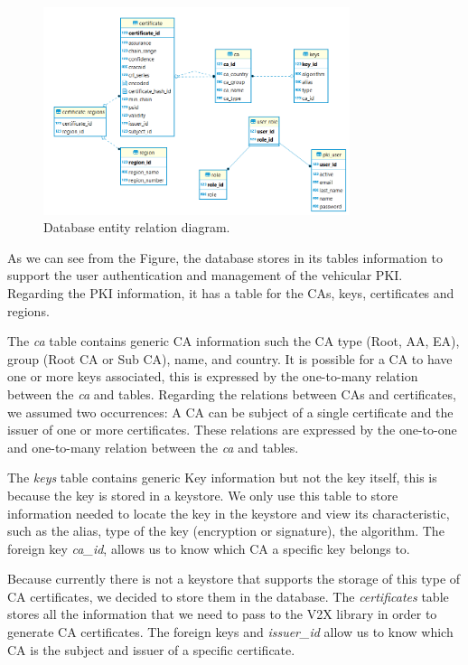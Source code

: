 \begin{figure}
	\centering
	\includegraphics[width=0.8\textwidth]{Figures/db_diagram}
	\caption{\label{fig:database_diagram}Database entity relation diagram.}
\end{figure}

As we can see from the Figure, the database stores in its tables information to support the user authentication and management of the vehicular PKI. Regarding the PKI information, it has a table for the CAs, keys, certificates and regions. 

The \textit{ca} table contains generic CA information such the CA type (Root, AA, EA), group (Root CA or Sub CA), name, and country. It is possible for a CA to have one or more keys associated, this is expressed by the one-to-many relation between the \textit{ca} and  tables. Regarding the relations between CAs and certificates, we assumed two occurrences: A CA can be subject of a single certificate and the issuer of one or more certificates. These relations are expressed by the one-to-one and one-to-many relation between the \textit{ca} and  tables.

The \textit{keys} table contains generic Key information but not the key itself, this is because the key is stored in a keystore. We only use this table to store information needed to locate the key in the keystore and view its characteristic, such as the alias, type of the key (encryption or signature), the algorithm. The foreign key \textit{ca\_id}, allows us to know which CA a specific key belongs to. 

Because currently there is not a keystore that supports the storage of this type of CA certificates, we decided to store them in the database. The \textit{certificates} table stores all the information that we need to pass to the V2X library in order to generate CA certificates. The foreign keys  and \textit{issuer\_id} allow us to know which CA is the subject and issuer of a specific certificate. 


